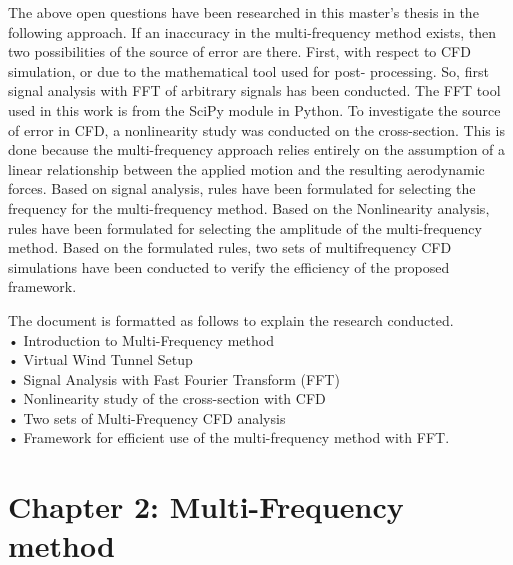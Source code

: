 \documentclass[a4paper, 12pt]{report}
\begin{document}
The above open questions have been researched in this master's thesis in the following approach. 
If an inaccuracy in the multi-frequency method exists, then two possibilities of the source of error 
are there. First, with respect to CFD simulation, or due to the mathematical tool used for post-
processing. So, first signal analysis with FFT of arbitrary signals has been conducted. The FFT tool 
used in this work is from the SciPy module in Python. To investigate the source of error in CFD, a 
nonlinearity study was conducted on the cross-section. This is done because the multi-frequency 
approach relies entirely on the assumption of a linear relationship between the applied motion and 
the resulting aerodynamic forces. Based on signal analysis, rules have been formulated for selecting 
the frequency for the multi-frequency method. Based on the Nonlinearity analysis, rules have been 
formulated for selecting the amplitude of the multi-frequency method. Based on the formulated 
rules, two sets of multifrequency CFD simulations have been conducted to verify the efficiency of 
the proposed framework.   
\vspace{0.5 cm}

\begin{flushleft}   
The document is formatted as follows to explain the research conducted. \\
\hspace{2cm}• Introduction to Multi-Frequency method   \\
\hspace{2cm}• Virtual Wind Tunnel Setup \\
\hspace{2cm}• Signal Analysis with Fast Fourier Transform (FFT) \\
\hspace{2cm}• Nonlinearity study of the cross-section with CFD  \\
\hspace{2cm}• Two sets of Multi-Frequency CFD analysis  \\
\hspace{2cm}• Framework for efficient use of the multi-frequency method with FFT.  \\
\end{flushleft}
\newpage


\section*{Chapter 2:    Multi-Frequency method}
\end{document}
